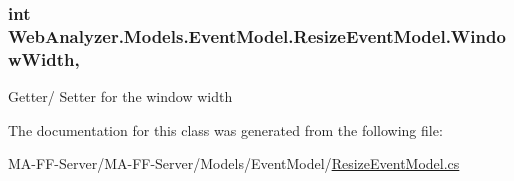 \subsubsection[{Window\+Width}]{\setlength{\rightskip}{0pt plus 5cm}int Web\+Analyzer.\+Models.\+Event\+Model.\+Resize\+Event\+Model.\+Window\+Width\hspace{0.3cm}{\ttfamily [get]}, {\ttfamily [set]}}\label{class_web_analyzer_1_1_models_1_1_event_model_1_1_resize_event_model_a4af3fc44a8ef02d431323fc2bce6c2e6}


Getter/ Setter for the window width 



The documentation for this class was generated from the following file\+:\begin{DoxyCompactItemize}
\item 
M\+A-\/\+F\+F-\/\+Server/\+M\+A-\/\+F\+F-\/\+Server/\+Models/\+Event\+Model/\hyperlink{_resize_event_model_8cs}{Resize\+Event\+Model.\+cs}\end{DoxyCompactItemize}
